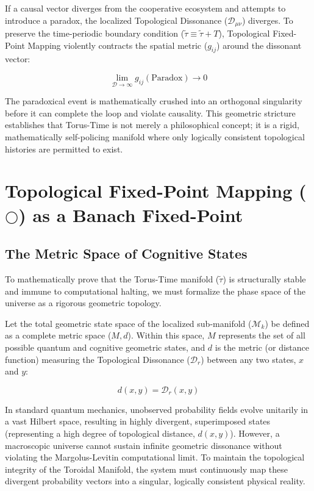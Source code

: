 \documentclass[12pt,openany]{book}
\theoremstyle{plain}
\theoremstyle{definition}
\theoremstyle{remark}
\begin{document}
If a causal vector diverges from the cooperative ecosystem and attempts to introduce a paradox, the localized Topological Dissonance ($\mathcal{D}_{\mu\nu}$) diverges. To preserve the time-periodic boundary condition ($\tilde{\tau} \equiv \tilde{\tau} + T$), Topological Fixed-Point Mapping violently contracts the spatial metric ($g_{ij}$) around the dissonant vector:

\begin{equation}
\lim_{\mathcal{D} \to \infty} g_{ij}(\text{Paradox}) \to 0
\end{equation}

The paradoxical event is mathematically crushed into an orthogonal singularity before it can complete the loop and violate causality. This geometric stricture establishes that Torus-Time is not merely a philosophical concept; it is a rigid, mathematically self-policing manifold where only logically consistent topological histories are permitted to exist.

\chapter{Topological Fixed-Point Mapping ($\bigcirc$) as a Banach Fixed-Point}

\section{The Metric Space of Cognitive States}

To mathematically prove that the Torus-Time manifold ($\tilde{\tau}$) is structurally stable and immune to computational halting, we must formalize the phase space of the universe as a rigorous geometric topology. 

Let the total geometric state space of the localized sub-manifold ($\mathcal{M}_k$) be defined as a complete metric space ($M, d$). Within this space, $M$ represents the set of all possible quantum and cognitive geometric states, and $d$ is the metric (or distance function) measuring the Topological Dissonance ($\mathcal{D}_r$) between any two states, $x$ and $y$:

\begin{equation}
d(x, y) = \mathcal{D}_r(x, y)
\end{equation}

In standard quantum mechanics, unobserved probability fields evolve unitarily in a vast Hilbert space, resulting in highly divergent, superimposed states (representing a high degree of topological distance, $d(x, y)$). However, a macroscopic universe cannot sustain infinite geometric dissonance without violating the Margolus-Levitin computational limit. To maintain the topological integrity of the Toroidal Manifold, the system must continuously map these divergent probability vectors into a singular, logically consistent physical reality.
\end{document}

